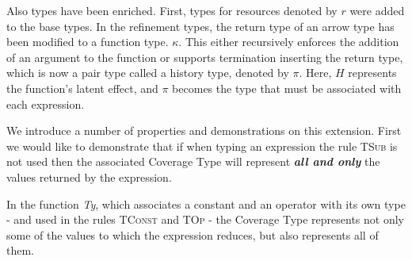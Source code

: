 Also types have been enriched. First, types for resources denoted by $r$ were added to the base types. In the refinement types, the return type of an arrow type has been modified to a function type. $\kappa$. This either recursively enforces the addition of an argument to the function or supports termination inserting the return type, which is now a pair type called a history type, denoted by $\pi$.
Here, $H$ represents the function's latent effect, and $\pi$ becomes the type that must be associated with each expression.

We introduce a number of properties and demonstrations on this extension. First we would like to demonstrate that if when typing an expression the rule \textsc{TSub} is not used then the associated Coverage Type will represent \textbf{\emph{all and only}} the values returned by the expression.

\begin{lemma}
    In the function \emph{Ty}, which associates a constant and an operator with its own type - and used in the rules \textsc{TConst} and \textsc{TOp} - the Coverage Type represents not only some of the values to which the expression reduces, but also represents all of them.
    \label{lemma:ty}
\end{lemma}


